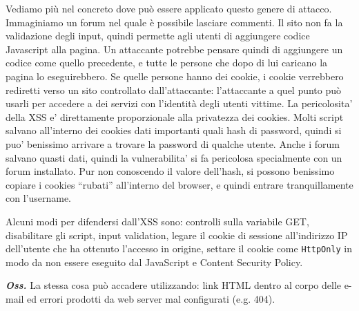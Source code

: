 Vediamo più nel concreto dove può essere applicato questo genere di attacco. Immaginiamo un forum nel quale è possibile lasciare commenti. Il sito non fa la validazione degli input, quindi permette agli utenti di aggiungere codice Javascript alla pagina. Un attaccante potrebbe pensare quindi di aggiungere un codice come quello precedente, e tutte le persone che dopo di lui caricano la pagina lo eseguirebbero. Se quelle persone hanno dei cookie, i cookie verrebbero rediretti verso un sito controllato dall'attaccante: l'attaccante a quel punto può usarli per accedere a dei servizi con l'identità degli utenti vittime. La pericolosita’ della XSS e’ direttamente proporzionale alla privatezza dei cookies. Molti script salvano all’interno dei cookies dati importanti quali hash di password, quindi si puo’ benissimo arrivare a trovare la password di qualche utente. Anche i forum salvano quasti dati, quindi la vulnerabilita’ si fa pericolosa specialmente con un forum installato. Pur non conoscendo il valore dell’hash, si possono benissimo copiare i cookies “rubati” all’interno del browser, e quindi entrare tranquillamente con l’username.

Alcuni modi per difendersi dall'XSS sono: controlli sulla variabile GET, disabilitare gli script, input validation, legare il cookie di sessione all'indirizzo IP dell'utente che ha ottenuto l'accesso in origine, settare il cookie come \texttt{HttpOnly} in modo da non essere eseguito dal JavaScript e Content Security Policy.

\textbf{\textit{Oss.}} La stessa cosa può accadere utilizzando: link HTML dentro al corpo delle e-mail ed errori prodotti da web server mal configurati (e.g. 404).

